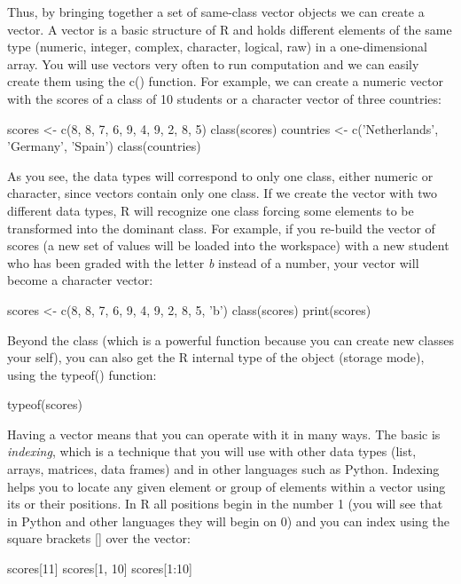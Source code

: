 Thus, by bringing together a set of same-class vector objects we can create a vector. A vector is a basic structure of R and holds different elements of the same type (numeric, integer, complex, character, logical, raw) in a one-dimensional array.	You will use vectors very often to run computation and we can easily create them using the c() function. For example, we can create a numeric vector with the scores of a class of 10 students or a character vector of three countries:

\begin{exampler}
scores <- c(8, 8, 7, 6, 9, 4, 9, 2, 8, 5)
class(scores)
countries <- c('Netherlands', 'Germany', 'Spain')
class(countries)
\end{exampler}
 
As you see, the data types will correspond to only one class, either numeric or character, since vectors contain only one class. If we create the vector with two different data types, R will recognize one class forcing some elements to be transformed into the dominant class. For example, if you re-build the vector of scores (a new set of values will be loaded into the workspace) with a new student who has been graded with the letter \emph{b} instead of a number, your vector will become a character vector:

\begin{exampler}
scores <- c(8, 8, 7, 6, 9, 4, 9, 2, 8, 5,  'b')
class(scores)
print(scores)
\end{exampler}

Beyond the class (which is a powerful function because you can create new classes your self), you can also get the R internal type of the object (storage mode), using the typeof() function:

\begin{exampler}
typeof(scores)
\end{exampler}

Having a vector means that you can operate with it in many ways. The basic is \emph{indexing}, which is a technique that you will use with other data types (list, arrays, matrices, data frames) and in other languages such as Python.  Indexing helps you to locate any given element or group of elements within a vector using its or their positions. In R all positions begin in the number 1 (you will see that in Python and other languages they will begin on 0) and you can index using the square brackets [] over the vector:

\begin{exampler}
scores[11]
scores[1, 10]
scores[1:10]
\end{exampler}


